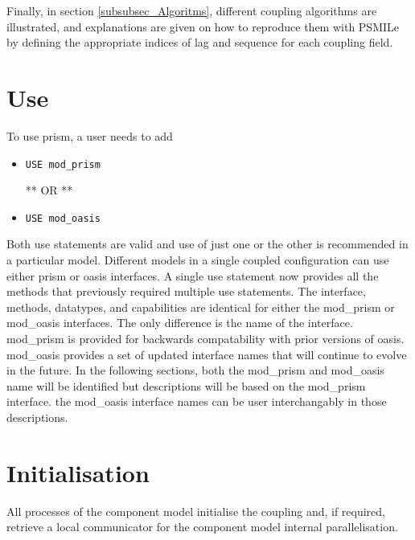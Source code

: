 Finally, in section \ref{subsubsec_Algoritms}, different coupling
algorithms are illustrated, and explanations are given on how to
reproduce them with PSMILe by defining the appropriate indices of
lag and sequence for each coupling field.

\section{Use}
\label{subsubsec_Use}

To use prism, a user needs to add 

\begin{itemize}

\item {\tt USE mod\_prism}

 ** OR **

\item {\tt USE mod\_oasis}
 
\end{itemize}

Both use statements are valid and use of just one or the other
is recommended in a particular model.  Different models in a single 
coupled configuration can use either prism or oasis interfaces.  
A single use statement now provides all the methods
that previously required multiple use statements.  The interface,
methods, datatypes, and capabilities are identical for either the
mod\_prism or mod\_oasis interfaces.  The only difference is the name
of the interface.  mod\_prism is provided
for backwards compatability with prior versions of oasis.  mod\_oasis
provides a set of updated interface names that will continue to evolve
in the future.  In the following sections, both the mod\_prism
and mod\_oasis name will be identified but descriptions will be based
on the mod\_prism interface.  the mod\_oasis interface names can be user 
interchangably in those descriptions.

\section{Initialisation}
\label{subsubsec_Initialisation}

All processes of the component model initialise the coupling and, if
required, retrieve a local communicator for the component model
internal parallelisation.

